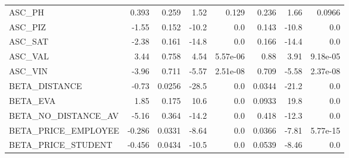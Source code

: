 \begin{tabular}{lrrrrrrr}
ASC\_PH              &  0.393 &    0.259 &    1.52 &    0.129 &         0.236 &         1.66 &        0.0966 \\
ASC\_PIZ             &  -1.55 &    0.152 &   -10.2 &      0.0 &         0.143 &        -10.8 &           0.0 \\
ASC\_SAT             &  -2.38 &    0.161 &   -14.8 &      0.0 &         0.166 &        -14.4 &           0.0 \\
ASC\_VAL             &   3.44 &    0.758 &    4.54 & 5.57e-06 &          0.88 &         3.91 &      9.18e-05 \\
ASC\_VIN             &  -3.96 &    0.711 &   -5.57 & 2.51e-08 &         0.709 &        -5.58 &      2.37e-08 \\
BETA\_DISTANCE       &  -0.73 &   0.0256 &   -28.5 &      0.0 &        0.0344 &        -21.2 &           0.0 \\
BETA\_EVA            &   1.85 &    0.175 &    10.6 &      0.0 &        0.0933 &         19.8 &           0.0 \\
BETA\_NO\_DISTANCE\_AV &  -5.16 &    0.364 &   -14.2 &      0.0 &         0.418 &        -12.3 &           0.0 \\
BETA\_PRICE\_EMPLOYEE & -0.286 &   0.0331 &   -8.64 &      0.0 &        0.0366 &        -7.81 &      5.77e-15 \\
BETA\_PRICE\_STUDENT  & -0.456 &   0.0434 &   -10.5 &      0.0 &        0.0539 &        -8.46 &           0.0 \\
\bottomrule
\end{tabular}

